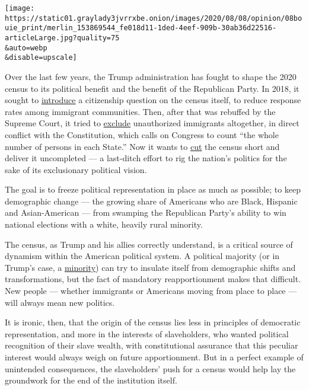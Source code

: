 \texttt{[image: https://static01.graylady3jvrrxbe.onion/images/2020/08/08/opinion/08bouie\_print/merlin\_153869544\_fe018d11-1ded-4eef-909b-30ab36d22516-articleLarge.jpg?quality=75\\\&auto=webp\\\&disable=upscale]}

Over the last few years, the Trump administration has fought to shape
the 2020 census to its political benefit and the benefit of the
Republican Party. In 2018, it sought to
\href{https://www.scotusblog.com/2019/07/trump-administration-ends-effort-to-include-citizenship-question-on-2020-census/}{introduce}
a citizenship question on the census itself, to reduce response rates
among immigrant communities. Then, after that was rebuffed by the
Supreme Court, it tried to
\href{https://www.vox.com/policy-and-politics/2020/7/21/21328714/trump-executive-order-immigration-census-2020-redistricting}{exclude}
unauthorized immigrants altogether, in direct conflict with the
Constitution, which calls on Congress to count ``the whole number of
persons in each State.'' Now it wants to
\href{https://www.npr.org/2020/08/03/898548910/census-cut-short-a-month-rushes-to-finish-all-counting-efforts-by-sept-30}{cut}
the census short and deliver it uncompleted --- a last-ditch effort to
rig the nation's politics for the sake of its exclusionary political
vision.

The goal is to freeze political representation in place as much as
possible; to keep demographic change --- the growing share of Americans
who are Black, Hispanic and Asian-American --- from swamping the
Republican Party's ability to win national elections with a white,
heavily rural minority.

The census, as Trump and his allies correctly understand, is a critical
source of dynamism within the American political system. A political
majority (or in Trump's case, a
\href{https://www.nytimes3xbfgragh.onion/2020/08/04/opinion/trump-2020-electoral-college.html}{minority})
can try to insulate itself from demographic shifts and transformations,
but the fact of mandatory reapportionment makes that difficult. New
people --- whether immigrants or Americans moving from place to place
--- will always mean new politics.

It is ironic, then, that the origin of the census lies less in
principles of democratic representation, and more in the interests of
slaveholders, who wanted political recognition of their slave wealth,
with constitutional assurance that this peculiar interest would always
weigh on future apportionment. But in a perfect example of unintended
consequences, the slaveholders' push for a census would help lay the
groundwork for the end of the institution itself.

